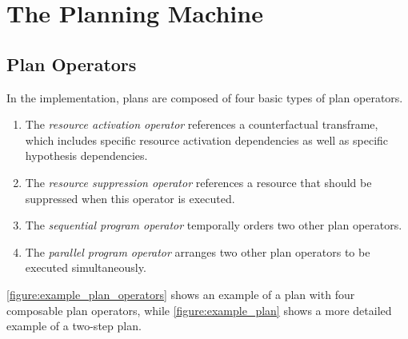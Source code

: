 \chapter{The Planning Machine}
\label{chapter:the_planning_machine}



\section{Plan Operators}

In the implementation, plans are composed of four basic types of plan
operators.
\begin{enumerate}
\item The \emph{resource activation operator} references a
  counterfactual transframe, which includes specific resource
  activation dependencies as well as specific hypothesis dependencies.
\item The \emph{resource suppression operator} references a resource
  that should be suppressed when this operator is executed.
\item The \emph{sequential program operator} temporally orders two
  other plan operators.
\item The \emph{parallel program operator} arranges two other plan
  operators to be executed simultaneously.
\end{enumerate}
{\mbox{\autoref{figure:example_plan_operators}}} shows an example of a
plan with four composable plan operators, while
{\mbox{\autoref{figure:example_plan}}} shows a more detailed example
of a two-step plan.
